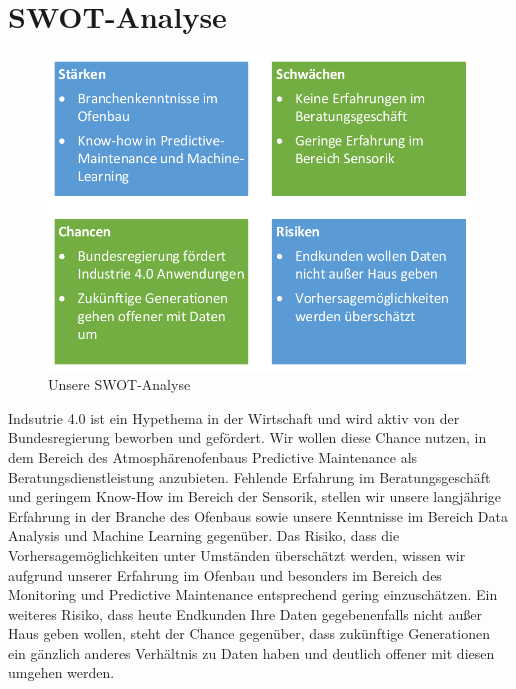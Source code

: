 \section{SWOT-Analyse}

\begin{figure}[H]
\centering
\includegraphics[width=0.7\linewidth]{Bilder/SWOT}
\caption{Unsere SWOT-Analyse}
\label{fig:SWOT}
\end{figure}


Indsutrie 4.0 ist ein Hypethema in der Wirtschaft und wird aktiv von der Bundesregierung beworben und gefördert. Wir wollen diese Chance nutzen, in dem Bereich des Atmosphärenofenbaus Predictive Maintenance als Beratungsdienstleistung anzubieten. Fehlende Erfahrung im Beratungsgeschäft und geringem Know-How im Bereich der Sensorik, stellen wir unsere langjährige Erfahrung in der Branche des Ofenbaus sowie unsere Kenntnisse im Bereich Data Analysis und Machine Learning gegenüber. Das Risiko, dass die Vorhersagemöglichkeiten unter Umständen überschätzt werden, wissen wir aufgrund unserer Erfahrung im Ofenbau und besonders im Bereich des Monitoring und Predictive Maintenance entsprechend gering einzuschätzen. Ein weiteres Risiko, dass heute Endkunden Ihre Daten gegebenenfalls nicht außer Haus geben wollen, steht der Chance gegenüber, dass zukünftige Generationen ein gänzlich anderes Verhältnis zu Daten haben und deutlich offener mit diesen umgehen werden.
